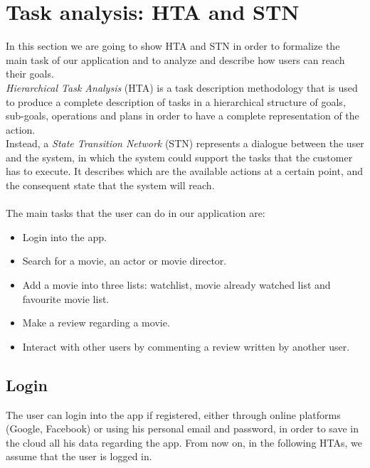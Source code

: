 \documentclass[12pt, a4paper]{article}
\numberwithin{figure}{section}
\begin{document}
\newpage

\section{Task analysis: HTA and STN}

In this section we are going to show HTA and STN in order to formalize the main task of
our application and to analyze and describe how users can reach their goals.\\
\textit{Hierarchical Task Analysis} (HTA) is a task description methodology that is used to produce a
complete description of tasks in a hierarchical structure of goals, sub-goals, operations and plans
in order to have a complete representation of the action.\\
Instead, a \textit{State Transition Network} (STN) represents a dialogue between the user and the system,
in which the system could support the tasks that the customer has to execute.
It describes which are the available actions at a certain point, and the consequent
state that the system will reach.\\\\
The main tasks that the user can do in our application are:
\begin{itemize}
	\item Login into the app.
	\item Search for a movie, an actor or movie director.
	\item Add a movie into three lists: watchlist, movie already watched list and favourite movie list.
	\item Make a review regarding a movie.
	\item Interact with other users by commenting a review written by another user.
\end{itemize}
\hbox{}
\subsection{Login}
The user can login into the app if registered, either through online platforms (Google, Facebook)
or using his personal email and password, in order to save in the cloud all his data regarding the app.
From now on, in the following HTAs, we assume that the user is logged in.\\
\end{document}

